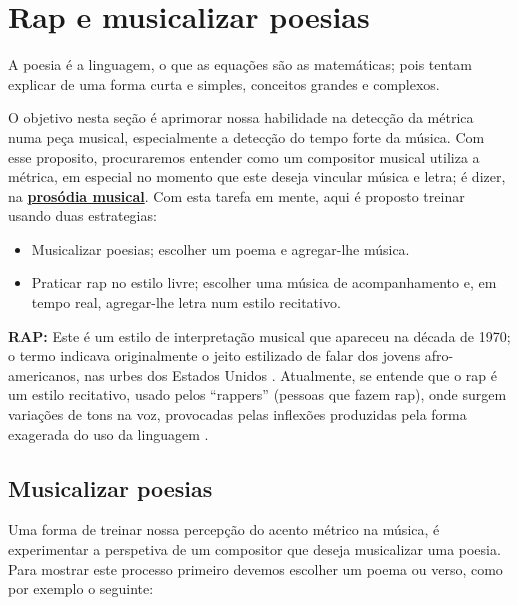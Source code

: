 
\section{Rap e musicalizar poesias}

\begin{FraseFernandoPR}
A poesia é a linguagem, o que as equações são as matemáticas;
pois tentam explicar de uma forma curta e simples,
conceitos grandes e complexos. %
\end{FraseFernandoPR}

O objetivo nesta seção é aprimorar nossa habilidade na detecção da métrica numa peça musical,
especialmente a detecção do tempo forte da música.
Com esse proposito, procuraremos entender como um compositor musical utiliza a métrica,
em especial no momento que este deseja vincular música e letra;
é dizer, na \hyperref[sec:ProsodiaMusical]{\textbf{prosódia musical}}. 
Com esta tarefa em mente, aqui é proposto treinar usando duas estrategias:
\begin{itemize}
\item Musicalizar poesias; escolher um poema e agregar-lhe música.
\item Praticar rap no estilo livre; escolher uma música de acompanhamento e, em tempo real, 
 agregar-lhe letra num estilo recitativo.
\end{itemize}


\begin{tcbinformation} 
\textbf{RAP:}
\label{ref:RAP}
 Este é um estilo de interpretação musical que apareceu na década de 1970;
o termo indicava originalmente o jeito estilizado de falar dos jovens afro-americanos, 
nas urbes dos Estados Unidos  \cite[pp. 1250]{latham2008diccionario}.
Atualmente, se entende que o rap é um estilo recitativo,
usado pelos ``rappers'' (pessoas que fazem rap),
onde surgem variações de tons na voz, 
provocadas pelas inflexões produzidas pela forma exagerada do uso da linguagem \cite[pp. 1250]{latham2008diccionario}.
\end{tcbinformation} 


\subsection{Musicalizar poesias}
\label{subsec:musicalizarpoesias}
Uma forma de treinar nossa percepção do acento métrico na música, 
é experimentar a perspetiva de um compositor que deseja musicalizar uma poesia.
Para mostrar este processo primeiro devemos escolher um poema ou verso,
como por exemplo o seguinte:

